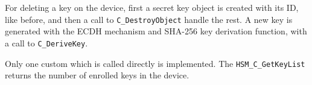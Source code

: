 For deleting a key on the device, first a secret key object is created with its ID, like before, and then a call to \texttt{C\_DestroyObject} handle the rest.
A new key is generated with the ECDH mechanism and \ac{SHA}-256 key derivation function, with a call to \texttt{C\_DeriveKey}.

Only one custom which is called directly is implemented. The \texttt{HSM\_C\_GetKeyList} returns the number of enrolled keys in the device.

